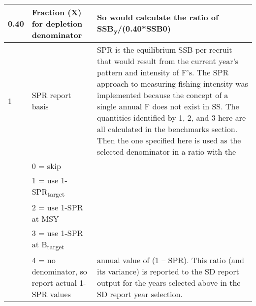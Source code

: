 {\begin{landscape}
\begin{longtable}{p{1.5cm} p{7cm} p{12.5cm}}
 \hline
 0.40 & Fraction (X) for depletion denominator & So would calculate the ratio of SSB\textsubscript{y}/(0.40*SSB0)\Tstrut\\

 \hline
 1 & SPR report basis & \multirow{1}{1cm}[-0.25cm]{\parbox{12.5cm}{SPR is the equilibrium SSB per recruit that would result from the current year’s pattern and intensity of F’s.  The SPR approach to measuring fishing intensity was implemented because the concept of a single annual F does not exist in SS.
 The quantities identified by 1, 2, and 3 here are all calculated in the benchmarks section.  Then the one specified here is used as the selected denominator in a ratio with the}}\Tstrut\\
   & 0 = skip & \\
   & 1 = use 1-SPR\textsubscript{target} & \\
   & 2 = use 1-SPR at MSY & \\
   & 3 = use 1-SPR at B\textsubscript{target} & \\
   & 4 = no denominator, so report actual 1-SPR values & \multirow{1}{1cm}[-0.25cm]{\parbox{12.5cm}{annual value of (1 – SPR). This ratio (and its variance) is reported to the SD report output for the years selected above in the SD report year selection.}}\Tstrut\\
  

\end{longtable}
\end{landscape}}
